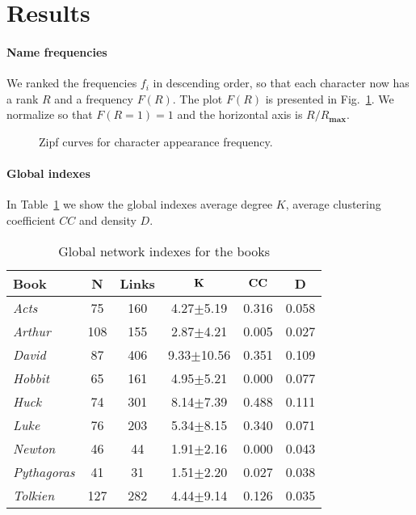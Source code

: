 \documentclass[review]{elsarticle}
\begin{document}
\section{Results}
\label{Results}


\paragraph{Name frequencies} We ranked the frequencies $f_i$ in descending order,
so that each character now has a rank $R$ and a frequency $F(R)$.
The plot $F(R)$ is presented in Fig.~\ref{fig:zipf}. We 
normalize so that $F(R=1)=1$ and the horizontal axis is 
$R/R_{\mathbf{max}}$.

\begin{figure}[ht]
	\centering
		\qquad
		\caption{Zipf curves for character appearance frequency.}
        \label{fig:zipf}
\end{figure}

\paragraph{Global indexes} 
In Table~\ref{tab:global} we show the global indexes average degree $K$,
average clustering coefficient $CC$ and density $D$.

\begin{table}[ht]
\centering\small
{\small\begin{tabular}{l|c|c|c|c|c}\hline
\bf\hfil Book\hfil  & \bf\hfil N\hfil  & \bf\hfil Links\hfil  
& \hfil $\bf K $\hfil  & \hfil $\bf CC$ 
\hfil  & \bf\hfil D\hfil  \\ \hline
 \emph{Acts} & 75 & 160 & 4.27$\pm$5.19 & 0.316 & 0.058\\ 
\emph{Arthur} & 108 & 155 & 2.87$\pm$4.21 & 0.005 & 0.027\\ 
\emph{David} & 87 & 406 & 9.33$\pm$10.56 & 0.351 & 0.109\\ 
\emph{Hobbit} & 65 & 161 & 4.95$\pm$5.21 & 0.000 & 0.077\\ 
\emph{Huck} & 74 & 301 & 8.14$\pm$7.39 & 0.488 & 0.111\\ 
\emph{Luke} & 76 & 203 & 5.34$\pm$8.15 & 0.340 & 0.071\\ 
\emph{Newton} & 46 & 44 & 1.91$\pm$2.16 & 0.000 & 0.043\\ 
\emph{Pythagoras} & 41 & 31 & 1.51$\pm$2.20 & 0.027 & 0.038\\ 
\emph{Tolkien} & 127 & 282 & 4.44$\pm$9.14 & 0.126 & 0.035\\ 
\hline\end{tabular}}
\caption{Global network indexes for the books} 
\label{tab:global}
\end{table}
\end{document}
